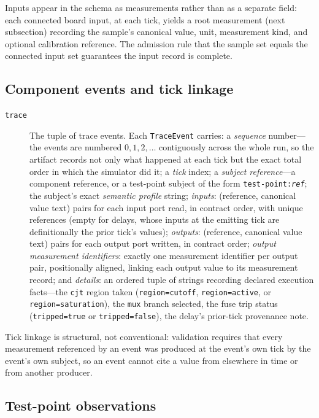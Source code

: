 Inputs appear in the schema as measurements rather than as a separate field: each connected board input, at each tick, yields a root measurement (next subsection) recording the sample's canonical value, unit, measurement kind, and optional calibration reference. The admission rule that the sample set equals the connected input set guarantees the input record is complete.

\subsection{Component events and tick linkage}

\begin{description}
\item[\texttt{trace}] The tuple of trace events. Each \texttt{TraceEvent} carries:
a \emph{sequence} number---the events are numbered $0, 1, 2, \ldots$ contiguously across the whole run, so the artifact records not only what happened at each tick but the exact total order in which the simulator did it;
a \emph{tick} index;
a \emph{subject reference}---a component reference, or a test-point subject of the form \texttt{test-point:\emph{ref}};
the subject's exact \emph{semantic profile} string;
\emph{inputs}: (reference, canonical value text) pairs for each input port read, in contract order, with unique references (empty for delays, whose inputs at the emitting tick are definitionally the prior tick's values);
\emph{outputs}: (reference, canonical value text) pairs for each output port written, in contract order;
\emph{output measurement identifiers}: exactly one measurement identifier per output pair, positionally aligned, linking each output value to its measurement record;
and \emph{details}: an ordered tuple of strings recording declared execution facts---the \texttt{cjt} region taken (\texttt{region=cutoff}, \texttt{region=active}, or \texttt{region=saturation}), the \texttt{mux} branch selected, the fuse trip status (\texttt{tripped=true} or \texttt{tripped=false}), the delay's prior-tick provenance note.
\end{description}

Tick linkage is structural, not conventional: validation requires that every measurement referenced by an event was produced at the event's own tick by the event's own subject, so an event cannot cite a value from elsewhere in time or from another producer.

\subsection{Test-point observations}

